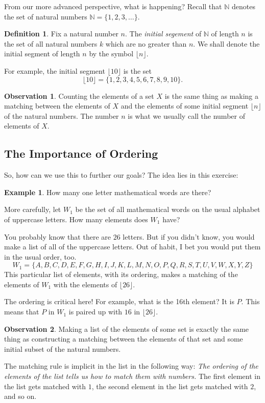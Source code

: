 \documentclass[12pt,letterpaper]{article}
\theoremstyle{definition}
\newtheorem{example}{Example}
\newtheorem*{definition}{Definition}
\newtheorem{observation}{Observation}
\begin{document}
From our more advanced perspective, what is happening?
Recall that $\mathbb{N}$ denotes the set of natural numbers $\mathbb{N} =\{1, 2, 3, \ldots\}$.
\begin{definition}
Fix a natural number $n$. 
The \emph{initial segement} of $\mathbb{N}$ of length $n$ is the set of all natural numbers $k$ which are no greater than $n$.
We shall denote the initial segment of length $n$ by the symbol $\lfloor n \rfloor$.
\end{definition}

For example, the initial segment $\lfloor 10 \rfloor$ is the set
\[
\lfloor 10 \rfloor = \{1, 2, 3, 4, 5, 6, 7, 8, 9, 10\}.
\]

\begin{observation}
Counting the elements of a set $X$ is the same thing as making a matching between the elements of $X$ and the elements of some initial segment $\lfloor n \rfloor$ of the natural numbers.
The number $n$ is what we usually call the number of elements of $X$.
\end{observation}


\subsection*{The Importance of Ordering}

So, how can we use this to further our goals?
The idea lies in this exercise:
\begin{example}
How many one letter mathematical words are there?

More carefully, let $W_1$ be the set of all mathematical words on the usual alphabet of uppercase letters.
How many elements does $W_1$ have?

You probably know that there are $26$ letters. 
But if you didn't know, you would make a list of all of the uppercase letters. 
Out of habit, I bet you would put them in the usual order, too.
\[
W_1 = \{ A, B, C, D, E, F, G, H, I, J, K, L, M, N, O, P, Q, R, S, T, U, V, W, X, Y, Z\}
\]
This particular list of elements, with its ordering, makes a matching of the elements of $W_1$ with the elements of $\lfloor 26 \rfloor$.

The ordering is critical here!
For example, what is the 16th element?
It is $P$.
This means that $P$ in $W_1$ is paired up with $16$ in $\lfloor 26 \rfloor$.
\end{example}

\begin{observation}
Making a list of the elements of some set is exactly the same thing as constructing a matching between the elements of that set and some initial subset of the natural numbers.

The matching rule is implicit in the list in the following way:
\emph{The ordering of the elements of the list tells us how to match them with numbers.}
The first element in the list gets matched with $1$, the second element in the list gets matched with $2$, and so on.
\end{observation}
\end{document}
